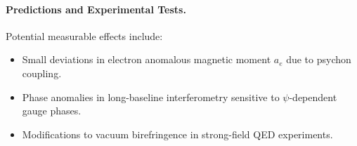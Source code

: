 \paragraph{Predictions and Experimental Tests.}
Potential measurable effects include:
\begin{itemize}
    \item Small deviations in electron anomalous magnetic moment \(a_e\) due to psychon coupling.
    \item Phase anomalies in long-baseline interferometry sensitive to \(\psi\)-dependent gauge phases.
    \item Modifications to vacuum birefringence in strong-field QED experiments.
\end{itemize}
